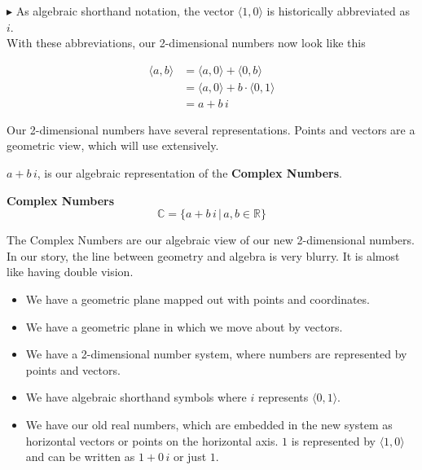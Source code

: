 \documentclass{ximera}
\begin{document}
$\blacktriangleright$  As algebraic shorthand notation, the vector $ \langle 1, 0 \rangle $ is historically abbreviated as $i$.  \\




With these abbreviations, our 2-dimensional numbers now look like this


\begin{align*}
\langle a, b \rangle & = \langle a, 0 \rangle + \langle 0, b \rangle  \\
         & = \langle a, 0 \rangle + b \cdot \langle 0, 1 \rangle  \\
          & = a + b \, i
\end{align*}




Our 2-dimensional numbers have several representations.  Points and vectors are a geometric view, which will use extensively.


 $a + b \, i$, is our algebraic representation of the \textbf{Complex Numbers}. \\







\begin{definition}  \textbf{\textcolor{green!50!black}{Complex Numbers}}  \\


\[   \mathbb{C}  = \{  a + b \, i   \, | \, a, b \in \mathbb{R}             \}               \]


\end{definition}













The Complex Numbers are our algebraic view of our new 2-dimensional numbers.  In our story, the line between geometry and algebra is very blurry. It is almost like having double vision.  


\begin{itemize}
\item We have a geometric plane mapped out with points and coordinates.
\item We have a geometric plane in which we move about by vectors.
\item We have a 2-dimensional number system, where numbers are represented by points and vectors.
\item We have algebraic shorthand symbols where $i$ represents $\langle 0, 1 \rangle$.
\item We have our old real numbers, which are embedded in the new system as horizontal vectors or points on the horizontal axis. $1$ is represented by $\langle 1, 0 \rangle$ and can be written as $1 + 0 \, i$ or just $1$.
\end{itemize}
\end{document}

